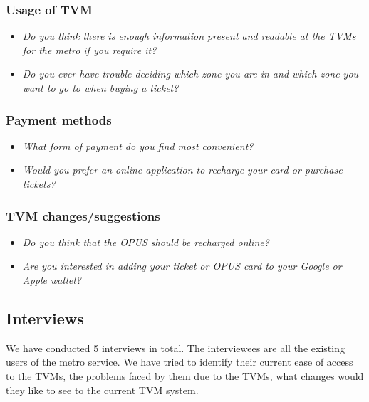 \documentclass[a4paper,12pt]{article}
\begin{document}
\subsubsection{Usage of TVM}
\begin{itemize}[noitemsep]
    \item \emph{Do you think there is enough information present and readable at the TVMs for the metro if you require it?}
    \item \emph{Do you ever have trouble deciding which zone you are in and which zone you want to go to when buying a ticket?}
\end{itemize}

\subsubsection{Payment methods}
\begin{itemize}[noitemsep]
    \item \emph{What form of payment do you find most convenient?}
    \item \emph{Would you prefer an online application to recharge your card or purchase tickets?}
\end{itemize}

\subsubsection{TVM changes/suggestions}
\begin{itemize}[noitemsep]
    \item \emph{Do you think that the OPUS should be recharged online?}
    \item \emph{Are you interested in adding your ticket or OPUS card to your Google or Apple wallet?}
\end{itemize}

\subsection{Interviews}
We have conducted 5 interviews in total. The interviewees are all the existing users of the metro service. We have tried to identify their current ease of access to the TVMs, the problems faced by them due to the TVMs, what changes would they like to see to the current TVM system.
\end{document}

